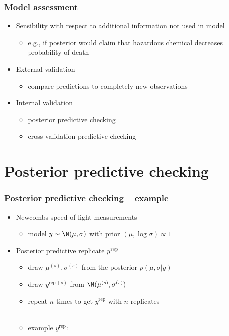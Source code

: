 \documentclass[10pt]{beamer}
\begin{document}
\begin{frame}

\frametitle{Model assessment}

  \begin{itemize}
  \item<+-> Sensibility with respect to additional information not used in model
    \begin{itemize}
    \item e.g., if posterior would claim that hazardous chemical
      decreases probability of death
    \end{itemize}
  \item<+-> External validation
    \begin{itemize}
    \item compare predictions to completely new observations
    \end{itemize}
  \item<+-> Internal validation
    \begin{itemize}
    \item posterior predictive checking
    \item cross-validation predictive checking
    \end{itemize}
  \end{itemize}

\end{frame}

\section{Posterior predictive checking}
\frame{\sectionpage}

\begin{frame}[fragile]
\frametitle{Posterior predictive checking -- example}

  \begin{itemize}
  \item<1-> Newcombs speed of light measurements
    \begin{itemize}
    \item model $y \sim \N(\mu,\sigma)$ with prior $(\mu, \log \sigma) \propto 1$
    \end{itemize}
  \item<2-> Posterior predictive replicate $y^{\rm rep}$
    \begin{itemize}
    \item<3-> draw $\mu^{(s)},\sigma^{(s)}$ from the posterior $p(\mu,\sigma|y)$
    \item<4-> draw $y^{\mathrm{rep}\,(s)}$ from $\N(\mu^{(s)},\sigma^{(s)})$
    \item<5-> repeat $n$ times to get $y^{\mathrm{rep}}$ with $n$ replicates\\~\\
    \item<6-> example $y^{\mathrm{rep}}$:
      \end{itemize}
    \end{itemize}

\end{frame}
\end{document}
